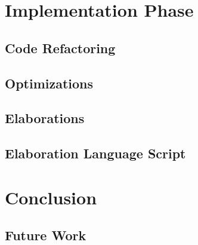 \documentclass{report}
\begin{document}
\chapter{Implementation Phase}

	\section{Code Refactoring}
	
	\section{Optimizations}
	
	\section{Elaborations}
	
	\section{Elaboration Language Script}


\chapter{Conclusion}

	\section{Future Work} 

\newpage
	
{}

	
\end{document}
